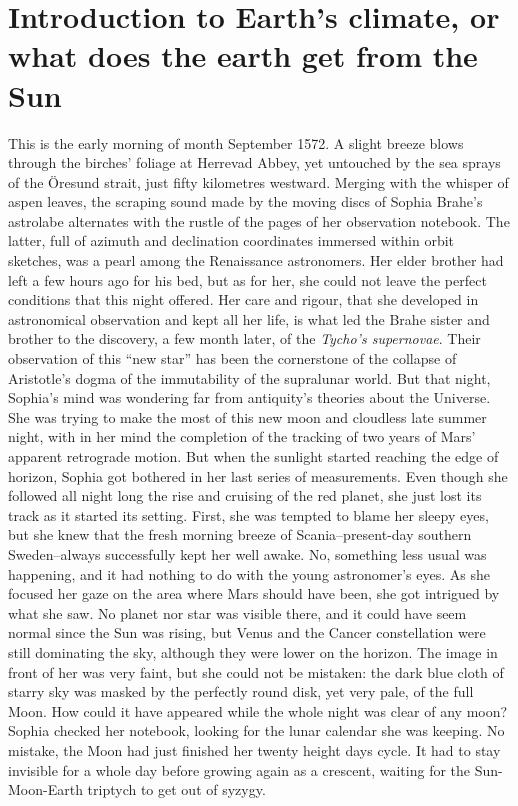 \section{Introduction to Earth's climate, or what does the earth get from the Sun} 
This is the early morning of month September 1572. A slight breeze blows through the birches' foliage at Herrevad Abbey, yet untouched by the sea sprays of the Öresund strait, just fifty kilometres westward.
Merging with the whisper of aspen leaves, the scraping sound made by the moving discs of Sophia Brahe's astrolabe alternates with the rustle of the pages of her observation notebook. The latter, full of azimuth and declination coordinates immersed within orbit sketches, was a pearl among the Renaissance astronomers. 
Her elder brother had left a few hours ago for his bed, but as for her, she could not leave the perfect conditions that this night offered. Her care and rigour, that she developed in astronomical observation and kept all her life, is what led the Brahe sister and brother to the discovery, a few month later, of the \textit{Tycho's supernovae}. Their observation of this ``new star'' has been the cornerstone of the collapse of Aristotle's dogma of the immutability of the supralunar world. 
But that night, Sophia's mind was wondering far from antiquity's theories about the Universe. She was trying to make the most of this new moon and cloudless late summer night, with in her mind the completion of the tracking of two years of Mars' apparent retrograde motion.
But when the sunlight started reaching the edge of horizon, Sophia got bothered in her last series of measurements. Even though she followed all night long the rise and cruising of the red planet, she just lost its track as it started its setting. 
First, she was tempted to blame her sleepy eyes, but she knew that the fresh morning breeze of Scania\---present-day southern Sweden\---always successfully kept her well awake.
No, something less usual was happening, and it had nothing to do with the young astronomer's eyes.
As she focused her gaze on the area where Mars should have been, she got intrigued by what she saw. No planet nor star was visible there, and it could have seem normal since the Sun was rising, but Venus and the Cancer constellation were still dominating the sky, although they were lower on the horizon. The image in front of her was very faint, but she could not be mistaken: the dark blue cloth of starry sky was masked by the perfectly round disk, yet very pale, of the full Moon.
How could it have appeared while the whole night was clear of any moon? Sophia checked her notebook, looking for the lunar calendar she was keeping. No mistake, the Moon had just finished her twenty height days cycle. It had to stay invisible for a whole day before growing again as a crescent, waiting for the Sun-Moon-Earth triptych to get out of syzygy. %

